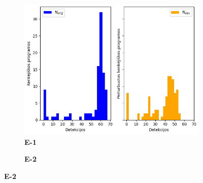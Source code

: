 
\label{app:experiment}
\begin{figure}[h]
    \begin{small}
        \caption{Originalių ($N_{orig}$) ir perturbuotų ($N_{adv}$) kenkėjiškų programų detekcijų pasiskirstymas}\label{fig:experiment:det_dist}
        \begin{center}
            \begin{subfigure}[t]{0.48\textwidth}
                \centering
                \caption{\textbf{E-1}}
                \includegraphics[width=\textwidth]{img/det_distributions_paper.png}
            \end{subfigure}
            \hfill
            \begin{subfigure}[t]{0.48\textwidth}
                \centering
                \caption{\textbf{E-2}}

\end{subfigure}
\end{center}
\end{small}
\end{figure}
